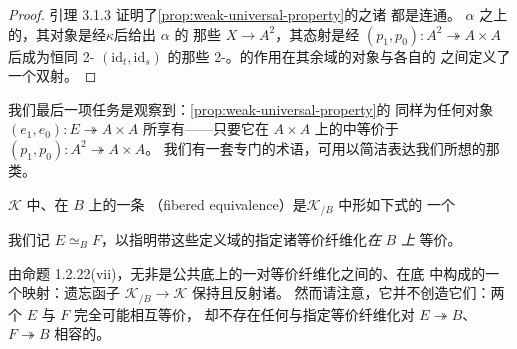 \begin{proof}
引理 3.1.3 证明了\cref{prop:weak-universal-property}的\trSmotheringFunctor{}之诸%
\trFiber{}都是连通\trGroupoid{}。
$\alpha$ 之上的\trFiber{}，其对象是经\trGenericArrow $\kappa$\trWhiskering{}后给出 $\alpha$ 的%
那些\trFunctor{} $X\to A^{2}$，其态射是经 $(p_{1},p_{0})\colon A^{2}\twoheadrightarrow A\times A$%
\trWhiskering{}后成为恒同 2-\trCell{} $(\mathrm{id}_{t},\mathrm{id}_{s})$ 的那些%
\trInvertible{} 2-\trCell{}。\trSmotheringFunctor{}的作用在其余域的对象与各自的%
\trFiber{}之间定义了一个双射。
\end{proof}

我们最后一项任务是观察到：\cref{prop:weak-universal-property}的\trUniversalProperty{}%
同样为任何对象 $(e_{1},e_{0})\colon E\twoheadrightarrow A\times A$ 所享有——只要它在%
$A\times A$ 上的\trSliceInfinityCosmos{}中等价于\trArrowInfinityCategory \allowbreak$(p_{1},p_{0})\colon A^{2}\twoheadrightarrow A\times A$。%
我们有一套专门的术语，可用以简洁表达我们所想的那类\trEquivalence{}。

\begin{definition}[\trFiberedEquivalence]\label{def:fibered-equivalence}
\trInfinityCosmos{} $\mathcal{K}$ 中、在\trInfinityCategory{} $B$ 上的一条%
\textbf{\trFiberedEquivalence}（fibered equivalence）是\trSliceInfinityCosmos $\mathcal{K}_{/B}$ 中形如下式的%
一个\trEquivalence
\begin{rveq}\label{eq:fibered-equivalence}
\end{rveq}
我们记 $E\simeq_{B}F$，以指明带这些定义域的指定诸等价纤维化\emph{在} $B$ \emph{上}%
等价。
\end{definition}

由命题 1.2.22(vii)，\trFiberedEquivalence{}无非是公共底上的一对等价纤维化之间的、在底%
\trInfinityCosmos{}中构成\trEquivalence{}的一个映射：遗忘函子 $\mathcal{K}_{/B}\to\mathcal{K}$%
保持且反射诸\trEquivalence{}。
然而请注意，它并不创造它们：两个\trInfinityCategory{} $E$ 与 $F$ 完全可能相互等价，%
却不存在任何与指定等价纤维化对 $E\twoheadrightarrow B$、$F\twoheadrightarrow B$%
相容的\trEquivalence{}。

